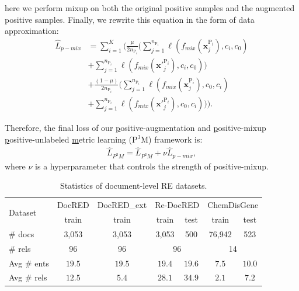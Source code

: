 \documentclass[11pt]{article}
\begin{document}
here we perform mixup on both the original positive samples and the augmented positive samples. Finally, we rewrite this equation in the form of data approximation:
\begin{equation}
\begin{aligned}\label{eq13}
\widehat{L}_{p-mix} &= \sum_{i=1}^{K} (\frac{\mu}{2n_{\mathrm{P}_{i}}} (\sum_{j=1}^{n_{\mathrm{P}_{i}}}\ell(f_{mix}(\boldsymbol{x}_{j}^{\mathrm{P}_{i}}), c_{i}, c_{0}) \\&+ \sum_{j=1}^{n_{\mathrm{P}_{i}}} \ell(f_{mix}(\boldsymbol{x'}_{j}^{\mathrm{P}_{i}}), c_{i}, c_{0})) \\&+ \frac{(1-\mu)}{2n_{\mathrm{P}_{i}}} (\sum_{j=1}^{n_{\mathrm{P}_{i}}}\ell(f_{mix}(\boldsymbol{x}_{j}^{\mathrm{P}_{i}}), c_{0}, c_{i}) \\&+ \sum_{j=1}^{n_{\mathrm{P}_{i}}} \ell(f_{mix}(\boldsymbol{x'}_{j}^{\mathrm{P}_{i}}), c_{0}, c_{i}))).
\end{aligned}
\end{equation}

Therefore, the final loss of our \underline{p}ositive-augmentation and \underline{p}ositive-mixup \underline{p}ositive-unlabeled \underline{m}etric learning (P$^{3}$M) framework is:
\begin{equation}
\begin{aligned}\label{eq14}
\widehat{L}_{P^{3}M} = \widehat{L}_{P^{2}M} + \nu \widehat{L}_{p-mix},
\end{aligned}
\end{equation}
where $\nu$ is a hyperparameter that controls the strength of positive-mixup.


\begin{table}[!ht]
\centering
\small
\begin{tabular}{lcccccc}
\hline \multirow{2}{*}{ Dataset } & \multicolumn{1}{c}{DocRED} & \multicolumn{1}{c}{DocRED\_ext} & \multicolumn{2}{c}{Re-DocRED} & \multicolumn{2}{c}{ChemDisGene} \\
 & train & train & train & test & train & test \\
\hline 
\# docs & 3,053 & 3,053 & 3,053 & 500 & 76,942 & 523 \\
\# rels & 96 & 96 & \multicolumn{2}{c}{96} & \multicolumn{2}{c}{14} \\
Avg \# ents & $19.5$ & $19.5$ & $19.4$ & $19.6$ & $7.5$ & $10.0$ \\
Avg \# rels & $12.5$ & $5.4$ & $28.1$ & $34.9$ & $2.1$ & $7.2$ \\
\hline
\end{tabular}
\caption{Statistics of document-level RE datasets.}
\label{tab1}
\end{table}
\end{document}
